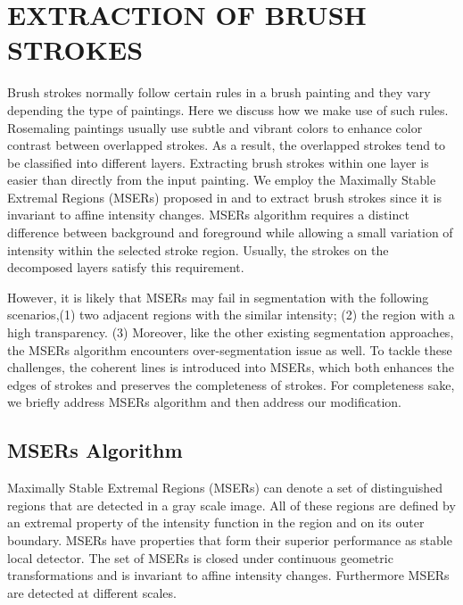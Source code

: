 \clearpage
\chapter{EXTRACTION OF BRUSH STROKES}

Brush strokes normally follow certain rules in a brush painting and they vary depending the type of paintings. Here we discuss how we make use of such rules. Rosemaling paintings usually use subtle and vibrant colors to enhance color contrast between overlapped strokes. As a result, the overlapped strokes tend to be classified into different layers. Extracting brush strokes within one layer is easier than directly from the input painting. We employ the Maximally Stable Extremal Regions (MSERs) proposed in \cite{donoser2006efficient} and \cite{nister2008linear} to extract brush strokes since it is invariant to affine intensity changes. MSERs algorithm requires a distinct difference between background and foreground while allowing a small variation of intensity within the selected stroke region. Usually, the strokes on the decomposed layers satisfy this requirement.


However, it is likely that MSERs may fail in segmentation with the following scenarios,\newline (1) two adjacent regions with the similar intensity; \newline (2) the region with a high transparency. \newline
(3) Moreover, like the other existing segmentation approaches, the MSERs algorithm encounters over-segmentation issue as well. To tackle these challenges, the coherent lines \cite{kang2007coherent} is introduced into MSERs, which both enhances the edges of strokes and preserves the completeness of strokes. For completeness sake, we briefly address MSERs algorithm and then address our modification.
\section{MSERs Algorithm}
Maximally Stable Extremal Regions (MSERs) \cite{matas2004robust} can denote a set of distinguished regions that are detected in a gray scale image. All of these regions are defined by an extremal property of the intensity function in the region and on its outer boundary. MSERs have properties that form their superior performance as stable local detector. The set of MSERs is closed under continuous geometric transformations and is invariant to affine intensity changes. Furthermore MSERs are detected at different scales.

